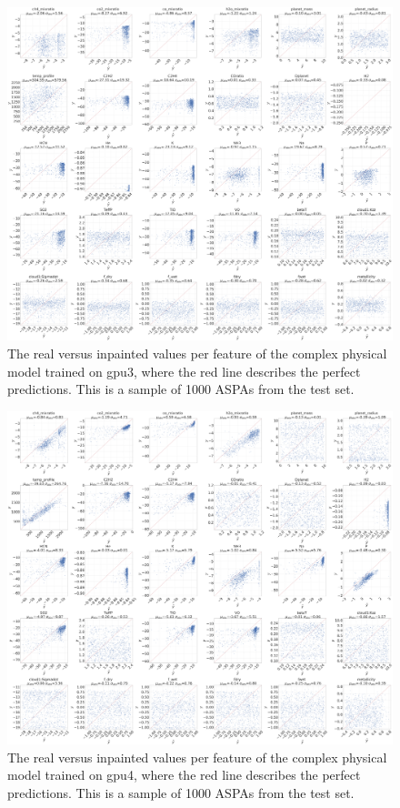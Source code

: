\begin{figure} [!htb]
    \centering
    \includegraphics[width=\textwidth,keepaspectratio]{figuren/small gpu3.png}
    \caption{The real versus inpainted values per feature of the complex physical model trained on gpu3, where the red line describes the perfect predictions. This is a sample of 1000 ASPAs from the test set.}
    \label{fig:gan_results_small_gpu3}
\end{figure}

\begin{figure} [!htb]
    \centering
    \includegraphics[width=\textwidth,keepaspectratio]{figuren/small gpu4.png}
    \caption{The real versus inpainted values per feature of the complex physical model trained on gpu4, where the red line describes the perfect predictions. This is a sample of 1000 ASPAs from the test set.}
    \label{fig:gan_results_small_gpu4}
\end{figure}

